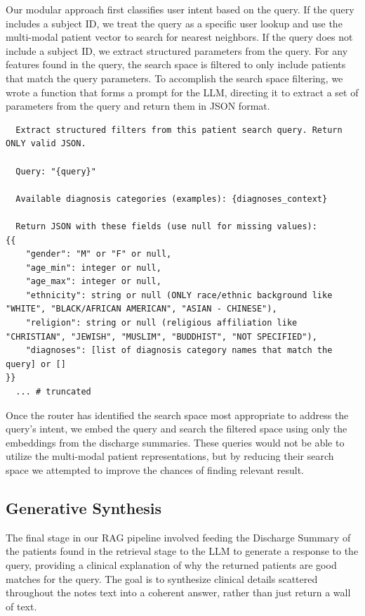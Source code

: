 \documentclass[acmtog]{acmart}
\begin{document}
Our modular approach first classifies user intent based on the query. If the query includes a subject ID, we treat the query as a specific user lookup and use the multi-modal patient vector to search for nearest neighbors. If the query does not include a subject ID, we extract structured parameters from the query. For any features found in the query, the search space is filtered to only include patients that match the query parameters. To accomplish the search space filtering, we wrote a function that forms a prompt for the LLM, directing it to extract a set of parameters from the query and return them in JSON format.

\begin{lstlisting}
  Extract structured filters from this patient search query. Return ONLY valid JSON.

  Query: "{query}"

  Available diagnosis categories (examples): {diagnoses_context}

  Return JSON with these fields (use null for missing values):
{{
    "gender": "M" or "F" or null,
    "age_min": integer or null,
    "age_max": integer or null,  
    "ethnicity": string or null (ONLY race/ethnic background like "WHITE", "BLACK/AFRICAN AMERICAN", "ASIAN - CHINESE"),
    "religion": string or null (religious affiliation like "CHRISTIAN", "JEWISH", "MUSLIM", "BUDDHIST", "NOT SPECIFIED"),
    "diagnoses": [list of diagnosis category names that match the query] or []
}}
  ... # truncated
\end{lstlisting}

Once the router has identified the search space most appropriate to address the query's intent, we embed the query and search the filtered space using only the embeddings from the discharge summaries. These queries would not be able to utilize the multi-modal patient representations, but by reducing their search space we attempted to improve the chances of finding relevant result.

\subsection{Generative Synthesis}
The final stage in our RAG pipeline involved feeding the Discharge Summary of the patients found in the retrieval stage to the LLM to generate a response to the query, providing a clinical explanation of why the returned patients are good matches for the query. The goal is to synthesize clinical details scattered throughout the notes text into a coherent answer, rather than just return a wall of text.
\end{document}
